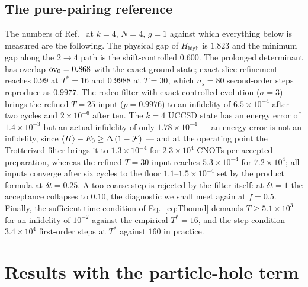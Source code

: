 \documentclass[
  aps,            %
  prc,            %
  reprint,        %
  superscriptaddress,
  floatfix,
  nofootinbib
]{revtex4-2}
\newcommand{\Hhigh}{H_{\mathrm{high}}}
\begin{document}
\subsection{The pure-pairing reference}
\label{sec:reference}
The numbers of Ref.~\cite{PairingCompanion} at $k=4$, $N=4$, $g=1$ against
which everything below is measured are the following.  The physical gap of
$\Hhigh$ is $1.823$ and the minimum gap along the $2\to4$ path is the
shift-controlled $0.600$.  The prolonged determinant has overlap
${\rm ov}_0=0.868$ with the exact ground state; exact-slice refinement
reaches $0.99$ at $T^{*}=16$ and $0.9988$ at $T=30$, which $n_s=80$
second-order steps reproduce as $0.9977$.  The rodeo filter with exact
controlled evolution ($\sigma=3$) brings the refined $T=25$ input
($p=0.9976$) to an infidelity of $6.5\times10^{-4}$ after two cycles and
$2\times10^{-6}$ after ten.  The $k=4$ UCCSD state has an energy error of
$1.4\times10^{-3}$ but an actual infidelity of only $1.78\times10^{-4}$ ---
an energy error is not an infidelity, since
$\expval{H}-E_0\ge\Delta\,(1-\mathcal F)$ --- and at the operating point the
Trotterized filter brings it to $1.3\times10^{-4}$ for $2.3\times10^{4}$
CNOTs per accepted preparation, whereas the refined $T=30$ input reaches
$5.3\times10^{-4}$ for $7.2\times10^{4}$; all inputs converge after six
cycles to the floor $1.1$--$1.5\times10^{-4}$ set by the product formula at
$\delta t=0.25$.  A too-coarse step is rejected by the filter itself: at
$\delta t=1$ the acceptance collapses to $0.10$, the diagnostic we shall
meet again at $f=0.5$.  Finally, the sufficient time condition of
Eq.~\eqref{eq:Tbound} demands $T\ge5.1\times10^{3}$ for an infidelity of
$10^{-2}$ against the empirical $T^{*}=16$, and the step condition
$3.4\times10^{4}$ first-order steps at $T^{*}$ against $160$ in practice.

\section{Results with the particle-hole term}
\label{sec:results}
\end{document}

